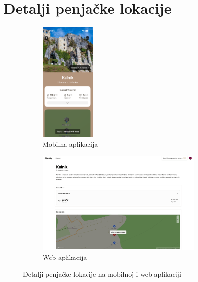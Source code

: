 \section{Detalji penjačke lokacije}

\begin{figure}[H]
    \centering
    \begin{subfigure}[b]{\textwidth}
        \centering
        \includegraphics[width=0.3\textwidth]{images/implementacija/crag-details/crag-details-top.png}
        \caption{Mobilna aplikacija}
        \label{fig:detalji_penjackih_lokacija_mob}
    \end{subfigure}
    \hfill
    \begin{subfigure}[b]{\textwidth}
        \centering
        \includegraphics[width=0.9\textwidth]{images/implementacija/web/crag-details/crag-details-top.png}
        \caption{Web aplikacija}
        \label{fig:detalji_penjackih_lokacija_web}
    \end{subfigure}
    \caption{Detalji penjačke lokacije na mobilnoj i web aplikaciji}
    \label{fig:detalji_penjackih_lokacija_1}
\end{figure}

